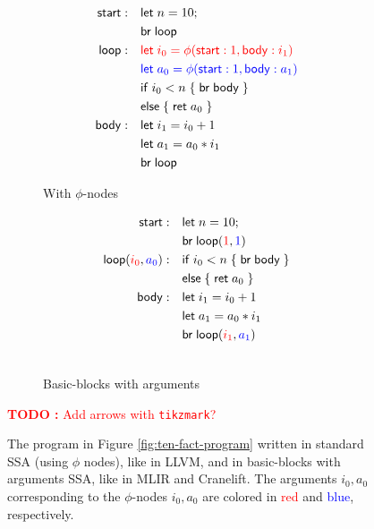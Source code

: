 \documentclass[acmsmall,screen,review]{acmart}
\newcounter{todos}
\newcommand{\TODO}[1]{{
  \stepcounter{todos}
  \begin{center}\large{\textcolor{red}{\textbf{TODO \arabic{todos}:} #1}}\end{center}
}}
\newcommand{\ms}[1]{\ensuremath{\mathsf{#1}}}
\begin{document}
\begin{figure}
  \begin{subfigure}[t]{.5\textwidth}
    \centering
    \begin{align*}
      \ms{start}:\quad  & \ms{let}\;n = 10; \\
                        & \ms{br}\;\ms{loop} \\
      \ms{loop}: \quad  & \begingroup \color{red}
                          \ms{let}\;i_0 = \phi(\ms{start}: 1, \ms{body}: i_1) 
                          \endgroup \\
                        & \begingroup \color{blue}
                          \ms{let}\;a_0 = \phi(\ms{start}: 1, \ms{body}: a_1) 
                          \endgroup \\
                        & \ms{if}\;i_0 < n\;\{\;\ms{br}\;\ms{body}\;\} \\
                        & \ms{else}\;\{\;\ms{ret}\;a_0\;\} \\
      \ms{body}: \quad  & \ms{let}\;i_1 = i_0 + 1 \\
                        & \ms{let}\;a_1 = a_0 * i_1 \\
                        & \ms{br}\;\ms{loop}
    \end{align*}
    \caption{With $\phi$-nodes}
  \end{subfigure}%
  \begin{subfigure}[t]{.5\textwidth}
    \centering
    \begin{align*}
      \ms{start}:\quad            & \ms{let}\;n = 10; \\
                                  & \ms{br}\;\ms{loop}(\textcolor{red}{1}, \textcolor{blue}{1}) \\
      \ms{loop}(\textcolor{red}{i_0}, \textcolor{blue}{a_0}): \quad  
                                  & \ms{if}\;i_0 < n\; \{\;\ms{br}\;\ms{body}\;\} \\
                                  & \ms{else}\;\{\;\ms{ret}\;a_0\;\} \\
      \ms{body}: \quad            & \ms{let}\;i_1 = i_0 + 1 \\
                                  & \ms{let}\;a_1 = a_0 * i_1 \\
                                  & \ms{br}\;\ms{loop}(\textcolor{red}{i_1}, \textcolor{blue}{a_1}) 
                                  \\ \\
    \end{align*}
    \caption{Basic-blocks with arguments}
  \end{subfigure}

  \TODO{Add arrows with \texttt{tikzmark}?}
  
  \caption{ The program in Figure \ref{fig:ten-fact-program} written in standard SSA (using $\phi$
    nodes), like in LLVM, and in basic-blocks with arguments SSA, like in MLIR and Cranelift. The
    arguments $i_0, a_0$ corresponding to the $\phi$-nodes $i_0, a_0$ are colored in
    \textcolor{red}{red} and \textcolor{blue}{blue}, respectively. }

  \Description{}
\end{figure}
\end{document}
